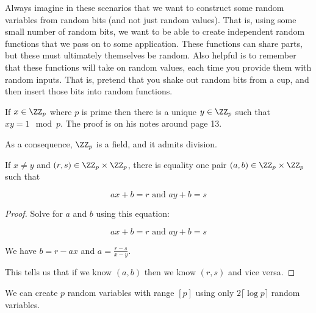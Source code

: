 \documentclass[../main.tex]{subfiles}
\begin{document}
\begin{remark}
    Always imagine in these scenarios that we want to construct some
    random variables from random bits (and not just random values). That is, using some small number of random bits, we want to be able to create independent random functions that we pass on to some application. These functions can share parts, but these must ultimately themselves be random. Also helpful is to remember that these functions will take on random values, each time you provide them with random inputs. That is, pretend that you shake out random bits from a cup, and then insert those bits into random functions.
\end{remark}

\begin{lemma}
    If $x \in \ZZ_{p}$ where $p$ is prime then there is a unique $y \in \ZZ_{p}$ such that $xy = 1 \mod p$. The proof is on his notes around page 13.
\end{lemma}

\begin{remark}
    As a consequence, $\ZZ_{p}$ is a field, and it admits division.
\end{remark}

\begin{lemma}
    If $x \not = y$ and $(r,s) \in \ZZ_p \times \ZZ_p$, there is equality one pair $(a,b) \in \ZZ_p \times \ZZ_p$ such that

    \[
        ax + b = r \text{ and } ay + b = s
    \]

\end{lemma}

\begin{proof}
    Solve for $a$ and $b$ using this equation:

    \[
        ax + b = r \text{ and } ay + b = s
    \]

    We have $b = r - ax$ and $a = \frac{r - s}{x - y}$.

    This tells us that if we know $(a,b)$ then we know $(r,s)$ and
    vice versa.
\end{proof}

\begin{theorem}
    We can create $p$ random variables with range $[p]$ using
    only $2 \lceil \log p \rceil$ random variables.
\end{theorem}
\end{document}
